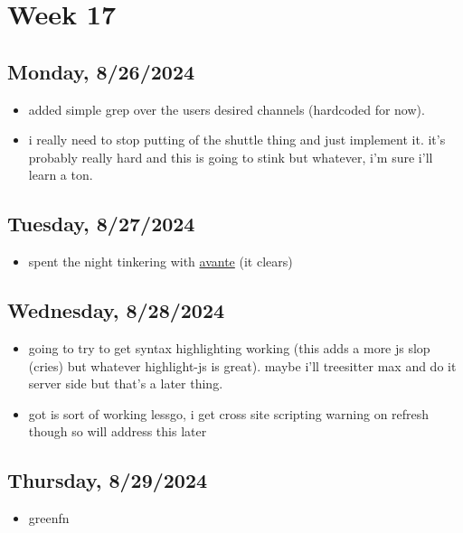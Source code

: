 \newpage
\section{Week 17}

\subsection*{Monday, 8/26/2024}
\begin{itemize}
    \item added simple grep over the users desired channels (hardcoded for now).
    \item i really need to stop putting of the shuttle thing and just implement
        it. it's probably really hard and this is going to stink but whatever,
        i'm sure i'll learn a ton.
\end{itemize}

\subsection*{Tuesday, 8/27/2024}
\begin{itemize}
    \item spent the night tinkering with 
        \textcolor{blue}{\href{https://github.com/yetone/avante.nvim}{avante}} 
        (it clears)
\end{itemize}

\subsection*{Wednesday, 8/28/2024}
\begin{itemize}
    \item going to try to get syntax highlighting working (this adds a more js
        slop (cries) but whatever highlight-js is great). maybe i'll treesitter
        max and do it server side but that's a later thing.
    \item got is sort of working lessgo, i get cross site scripting warning on
        refresh though so will address this later
\end{itemize}

\subsection*{Thursday, 8/29/2024}
\begin{itemize}
    \item greenfn
\end{itemize}

